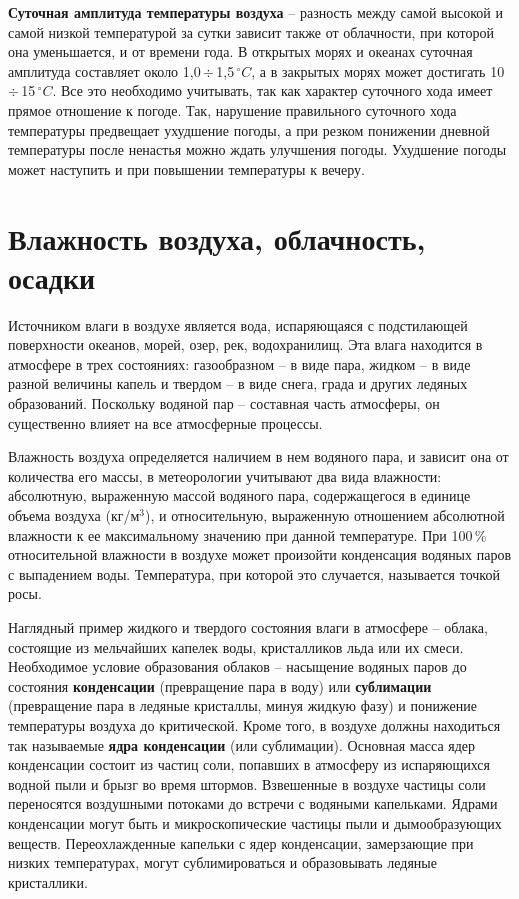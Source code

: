 \documentclass[a4paper, 12pt, twoside, final, book, russian, fittopage, cyremdash]{ncc}
\newcommand{\grC}{\ensuremath{\,^{\circ}C}\xspace}
\newcommand{\otdo}{\,\ensuremath{\div}\,}
\begin{document}
\textbf{Суточная амплитуда температуры воздуха} \--- разность между самой высокой и самой низкой температурой за сутки зависит также от облачности, при которой она уменьшается, и от времени года. В открытых морях и океанах суточная амплитуда составляет около 1,0\otdo 1,5\grC, а в закрытых морях может достигать 10\otdo 15\grC. Все это необходимо учитывать, так как характер суточного хода имеет прямое отношение к погоде. Так, нарушение правильного суточного хода температуры предвещает ухудшение погоды, а при резком понижении дневной температуры после ненастья можно ждать улучшения погоды. Ухудшение погоды может наступить и при повышении температуры к вечеру.

\section{Влажность воздуха, облачность, осадки}

Источником влаги в воздухе является вода, испаряющаяся с подстилающей поверхности океанов, морей, озер, рек, водохранилищ. Эта влага находится в атмосфере в трех состояниях: газообразном \--- в виде пара, жидком \--- в виде разной величины капель и твердом \--- в виде снега, града и других ледяных образований. Поскольку водяной пар \--- составная часть атмосферы, он существенно влияет на все атмосферные процессы.

Влажность воздуха определяется наличием в нем водяного пара, и зависит она от количества его массы, в метеорологии учитывают два вида влажности: абсолютную, выраженную массой водяного пара, содержащегося в единице объема воздуха (кг/м$^3$), и относительную, выраженную отношением абсолютной влажности к ее максимальному значению при данной температуре. При 100\,\% относительной влажности в воздухе может произойти конденсация водяных паров с выпадением воды. Температура, при которой это случается, называется точкой росы.

Наглядный пример жидкого и твердого состояния влаги в атмосфере \--- облака, состоящие из мельчайших капелек воды, кристалликов льда или их смеси. Необходимое условие образования облаков \--- насыщение водяных паров до состояния \textbf{конденсации} (превращение пара в воду) или \textbf{сублимации} (превращение пара в ледяные кристаллы, минуя жидкую фазу) и понижение температуры воздуха до критической. Кроме того, в воздухе должны находиться так называемые \textbf{ядра конденсации} (или сублимации). Основная масса ядер конденсации состоит из частиц соли, попавших в атмосферу из испаряющихся водной пыли и брызг во время штормов. Взвешенные в воздухе частицы соли переносятся воздушными потоками до встречи с водяными капельками. Ядрами конденсации могут быть и микроскопические частицы пыли и дымообразующих веществ. Переохлажденные капельки с ядер конденсации, замерзающие при низких температурах, могут сублимироваться и образовывать ледяные кристаллики.
\end{document}
